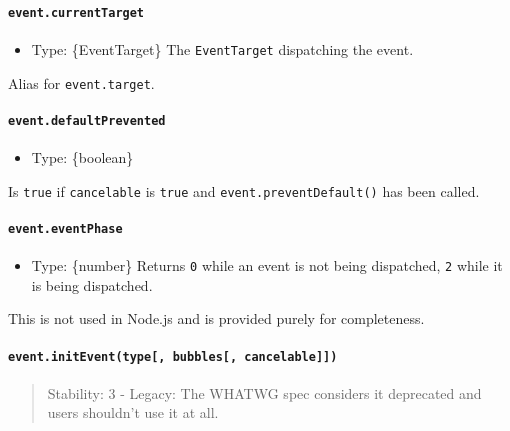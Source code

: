 \paragraph{\texorpdfstring{\texttt{event.currentTarget}}{event.currentTarget}}\label{event.currenttarget}

\begin{itemize}
\tightlist
\item
  Type: \{EventTarget\} The \texttt{EventTarget} dispatching the event.
\end{itemize}

Alias for \texttt{event.target}.

\paragraph{\texorpdfstring{\texttt{event.defaultPrevented}}{event.defaultPrevented}}\label{event.defaultprevented}

\begin{itemize}
\tightlist
\item
  Type: \{boolean\}
\end{itemize}

Is \texttt{true} if \texttt{cancelable} is \texttt{true} and
\texttt{event.preventDefault()} has been called.

\paragraph{\texorpdfstring{\texttt{event.eventPhase}}{event.eventPhase}}\label{event.eventphase}

\begin{itemize}
\tightlist
\item
  Type: \{number\} Returns \texttt{0} while an event is not being
  dispatched, \texttt{2} while it is being dispatched.
\end{itemize}

This is not used in Node.js and is provided purely for completeness.

\paragraph{\texorpdfstring{\texttt{event.initEvent(type{[},\ bubbles{[},\ cancelable{]}{]})}}{event.initEvent(type{[}, bubbles{[}, cancelable{]}{]})}}\label{event.initeventtype-bubbles-cancelable}

\begin{quote}
Stability: 3 - Legacy: The WHATWG spec considers it deprecated and users
shouldn't use it at all.
\end{quote}

